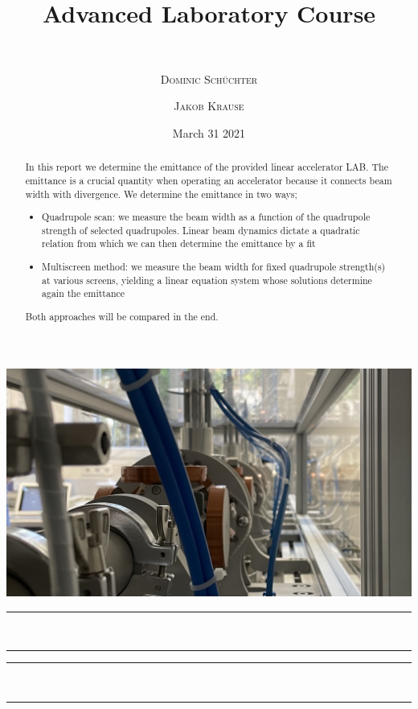 \documentclass[11pt,a4paper,notitlepage]{scrartcl}
\title{ Advanced Laboratory Course}
\subtitle{\name  \\ \hrulefill}
\date{March 31 2021 \\ }
\author[*]{\textsc{Dominic Schüchter}}
\author[$\dagger$]{\textsc{Jakob Krause}}
\affil[*]{\href{mailto:dschuechter@uni-bonn.de}{\faEnvelope  \hspace*{0.1cm}dschuechter@uni-bonn.de} {\color{black}$|$} \href{https://github.com/dschuechter}{\faGithub  \hspace*{0.1cm}dschuechter}}
\affil[$\dagger$]{\href{mailto:krause.jakob@uni-bonn.de}{\faEnvelope  \hspace*{0.1cm}krause.jakob@uni-bonn.de} {\color{black}$|$} \href{https://github.com/krausejm}{\faGithub  \hspace*{0.1cm}krausejm}}
\begin{document}
\maketitle
\vspace{-.8cm}
\thispagestyle{empty}
\begin{center}
\includegraphics[width=\linewidth]{titlepic}
\vspace{-.2cm}

\rule{12cm}{1pt} \\\vspace{-.6cm} \rule{10cm}{1pt}
\end{center}

\renewcommand{\abstractnamefont}{\normalfont\scriptsize\bfseries}
\renewcommand{\abstracttextfont}{\normalfont\scriptsize}

\begin{abstract}
	In this report we determine the emittance of the provided linear accelerator LAB. The emittance is a crucial quantity when operating an accelerator because it connects beam width with divergence. We determine the emittance in two ways; \begin{itemize}
		\item Quadrupole scan: we measure the beam width as a function of the quadrupole strength of selected quadrupoles. Linear beam dynamics dictate a quadratic relation from which we can then determine the emittance by a fit
		\item Multiscreen method: we measure the beam width for fixed quadrupole strength(s) at various screens, yielding a linear equation system whose solutions determine again the emittance
	\end{itemize}
Both approaches will be compared in the end.
\end{abstract}
\begin{center}
	\rule{10cm}{1pt} \\\vspace{-.6cm} \rule{12cm}{1pt}
\end{center}
\end{document}
